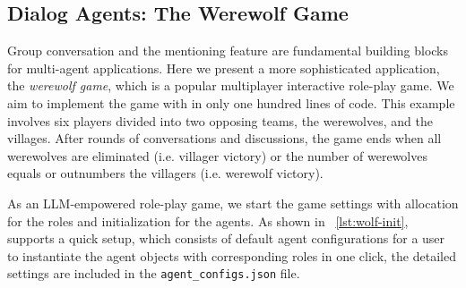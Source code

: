 \subsection{Dialog Agents: The Werewolf Game}

Group conversation and the mentioning feature are fundamental building blocks for multi-agent applications. Here we present a more sophisticated application, the \textit{werewolf game}, which is a popular multiplayer interactive role-play game. We aim to implement the game with \ours in only one hundred lines of code. This example involves six players divided into two opposing teams, the werewolves, and the villages. After rounds of conversations and discussions, the game ends when all werewolves are eliminated (i.e. villager victory) or the number of werewolves equals or outnumbers the villagers (i.e. werewolf victory).

As an LLM-empowered role-play game, we start the game settings with allocation for the roles and initialization for the agents. As shown in \lstlistingname~\ref{lst:wolf-init}, \ours supports a quick setup, which consists of default agent configurations for a user to instantiate the agent objects with corresponding roles in one click, the detailed settings are included in the \texttt{agent\_configs.json} file.

